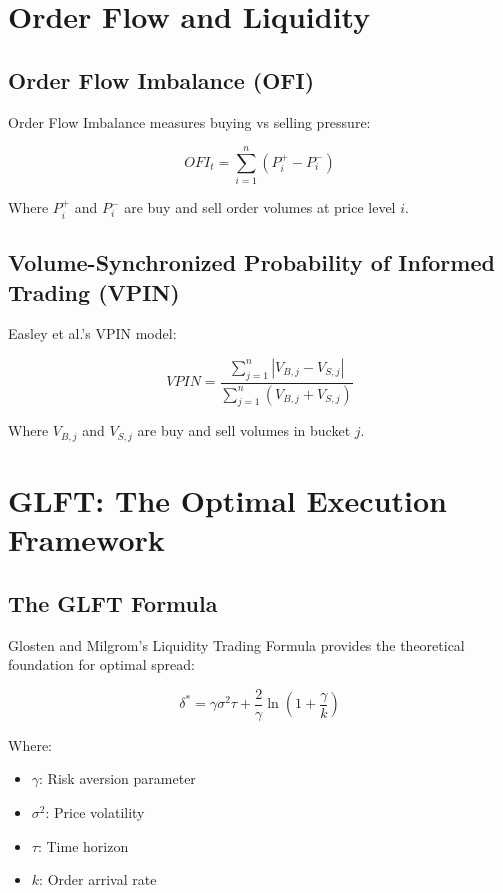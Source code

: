 \documentclass[11pt,letterpaper]{book}
\begin{document}
\section{Order Flow and Liquidity}

\subsection{Order Flow Imbalance (OFI)}

Order Flow Imbalance measures buying vs selling pressure:

\begin{equation}
OFI_t = \sum_{i=1}^n (P_i^+ - P_i^-)
\end{equation}

Where $P_i^+$ and $P_i^-$ are buy and sell order volumes at price level $i$.

\subsection{Volume-Synchronized Probability of Informed Trading (VPIN)}

Easley et al.'s VPIN model:

\begin{equation}
VPIN = \frac{\sum_{j=1}^n |V_{B,j} - V_{S,j}|}{\sum_{j=1}^n (V_{B,j} + V_{S,j})}
\end{equation}

Where $V_{B,j}$ and $V_{S,j}$ are buy and sell volumes in bucket $j$.

\section{GLFT: The Optimal Execution Framework}

\subsection{The GLFT Formula}

Glosten and Milgrom's Liquidity Trading Formula provides the theoretical foundation for optimal spread:

\begin{equation}
\delta^* = \gamma \sigma^2 \tau + \frac{2}{\gamma} \ln\left(1 + \frac{\gamma}{k}\right)
\end{equation}

Where:
\begin{itemize}
    \item $\gamma$: Risk aversion parameter
    \item $\sigma^2$: Price volatility
    \item $\tau$: Time horizon
    \item $k$: Order arrival rate
\end{itemize}
\end{document}

